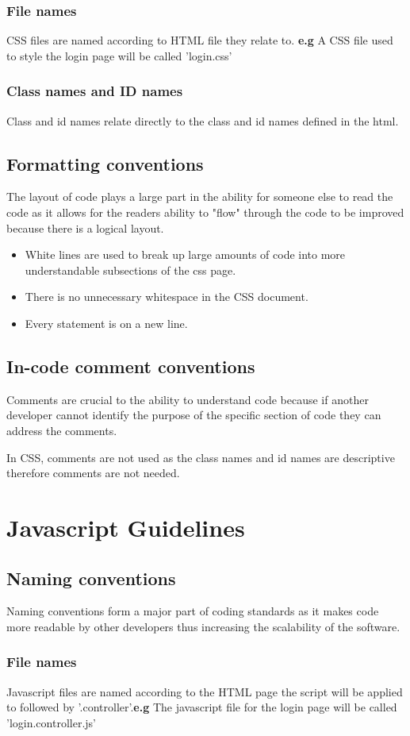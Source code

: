 \documentclass[11pt]{article}
\begin{document}
	\subsubsection{File names}
	CSS files are named according to HTML file they relate to. \textbf{e.g} A CSS file used to style the login page will be called 'login.css'
	\subsubsection{Class names and ID names}
	Class and id names relate directly to the class and id names defined in the html.
	\subsection{Formatting conventions}
	The layout of code plays a large part in the ability for someone else to read the code as it allows for the readers ability to "flow" through the code to be improved because there is a logical layout.
	\begin{itemize}
		\item White lines are used to break up large amounts of code into more understandable subsections of the css page.
		\item There is no unnecessary whitespace in the CSS document.
		\item Every statement is on a new line.
	\end{itemize}
	\subsection{In-code comment conventions}
	Comments are crucial to the ability to understand code because if another developer cannot identify the purpose of the specific section of code they can address the comments.
	
	In CSS, comments are not used as the class names and id names are descriptive therefore comments are not needed.
	
	\section{Javascript Guidelines}
	\subsection{Naming conventions}
	Naming conventions form a major part of coding standards as it makes code more readable by other developers thus increasing the scalability of the software.
	\subsubsection{File names}
	Javascript files are named according to the HTML page the script will be applied to followed by '.controller'.\textbf{e.g} The javascript file for the login page will be called 'login.controller.js'
	
\end{document}
